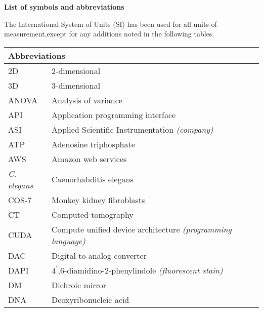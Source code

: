 
 \vspace*{3em} \thispagestyle{empty}
\begin {flushleft}
	\huge \textbf{List of symbols and abbreviations}
\end{flushleft}
\vspace*{2em}

\begin{flushleft}
The International System of Units (SI) has been used for all units of measurement,\newline except for any additions noted in the following tables.

\begin{longtable}[l]{|p{5.5em}|p{25em}|}
\hline
\multicolumn{2}{|l|}{\textbf{Abbreviations}} \\
\hline
2D         & 2-dimensional                                              \\
3D         & 3-dimensional                                              \\
ANOVA      & Analysis of variance                                       \\
API        & Application programming interface                          \\
ASI        & Applied Scientific Instrumentation \textit{(company)}               \\
ATP        & Adenosine triphosphate                                     \\
AWS        & Amazon web services                                        \\
\textit{C. elegans} & Caenorhabditis elegans                                     \\
COS-7      & Monkey kidney fibroblasts                                  \\
CT         & Computed tomography                                        \\
CUDA       & Compute unified device architecture \textit{(programming language)} \\
DAC        & Digital-to-analog converter                                \\
DAPI       & $4^\prime$,6-diamidino-2-phenylindole \textit{(fluorescent stain)}          \\
DM         & Dichroic mirror                                            \\
DNA        & Deoxyribonucleic acid                                      \\

\end{longtable}
\end{flushleft}
